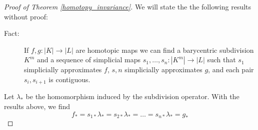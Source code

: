 \documentclass[toc=bib, headinclude]{scrartcl}
\theoremstyle{plain}
\theoremstyle{definition}
\theoremstyle{remark}
\begin{document}
	
	\begin{proof}[Proof of Theorem \ref{homotopy_invariance}]
		We will state the the following results without proof:
		\begin{description}
			\item[Fact:] If $f,g:|K|\to |L|$ are homotopic maps we can find a barycentric subdivision $K^m$ and a sequence of simplicial maps $s_1,\dots,s_n:|K^m|\to|L|$ such that $s_1$ simplicially approximates $f$, $s,n$ simplicially approximates $g$, and each pair $s_i,s_{i+1}$ is contiguous.
		\end{description}
		Let $\lambda_\ast$ be the homomorphism induced by the subdivision operator. With the results above, we find
		\[
		f_\ast=s_{1\ast}\lambda_\ast=s_{2\ast}\lambda_\ast=\dots=s_{n\ast}\lambda_\ast=g_\ast
		\]
	\end{proof}
	




\printbibliography
\end{document}
